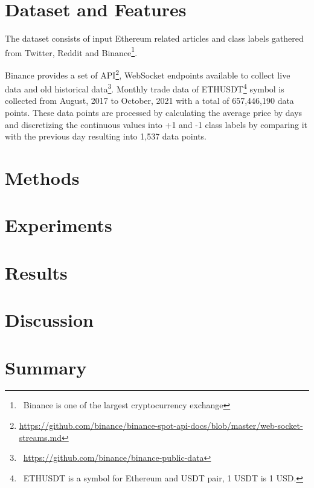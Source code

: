 \documentclass[transmag]{IEEEtran}
\begin{document}
\section{Dataset and Features}
The dataset consists of input Ethereum related articles and class labels gathered from Twitter, Reddit and Binance\footnote{\ Binance is one of the largest cryptocurrency exchange}.



Binance provides a set of API\footnote{\url{https://github.com/binance/binance-spot-api-docs/blob/master/web-socket-streams.md}}, WebSocket endpoints available to collect live data and old historical data\footnote{\ \url{https://github.com/binance/binance-public-data}}. Monthly trade data of ETHUSDT\footnote{\ ETHUSDT is a symbol for Ethereum and USDT pair, 1 USDT is 1 USD.} symbol is collected from August, 2017 to October, 2021 with a total of 657,446,190 data points. These data points are processed by calculating the average price by days and discretizing the continuous values into +1 and -1 class labels by comparing it with the previous day resulting into 1,537 data points.





\section{Methods}

\section{Experiments}

\section{Results}

\section{Discussion}

\section{Summary}












\newpage\null\thispagestyle{empty}\newpage
\end{document}
